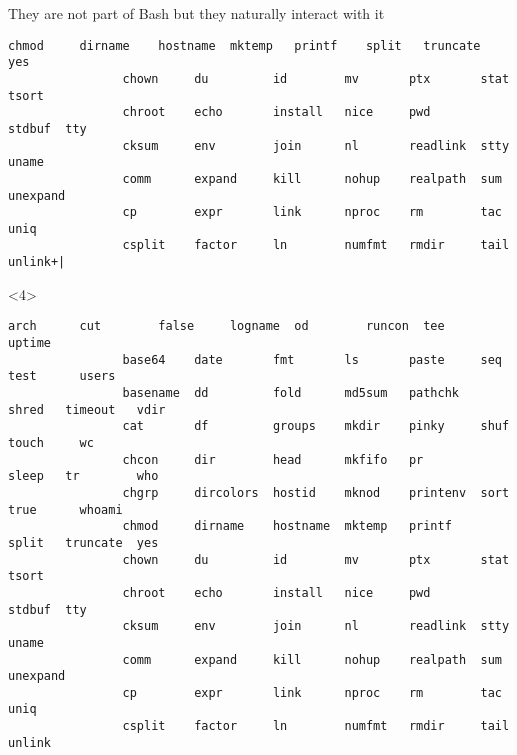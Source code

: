 \begin{frame}[fragile]{They are not part of Bash but they naturally interact with it}
\begin{overlayarea}{\textwidth}{0.6\textheight}
\begin{onlyenv}
\begin{lstlisting}[style=myBash, style=smaller, numbers=none, aboveskip=3mm]
                chmod     dirname    hostname  mktemp   printf    split   truncate  yes
                chown     du         id        mv       ptx       stat    tsort
                chroot    echo       install   nice     pwd       stdbuf  tty
                cksum     env        join      nl       readlink  stty    uname
                comm      expand     kill      nohup    realpath  sum     unexpand
                cp        expr       link      nproc    rm        tac     uniq
                csplit    factor     ln        numfmt   rmdir     tail    unlink+|
            \end{lstlisting}
        \end{onlyenv}
        \begin{onlyenv}<4>
            \begin{lstlisting}[style=myBash, style=smaller, numbers=none, aboveskip=3mm, belowskip=-8mm, deletekeywords={env, expr, nice, nohup}]
                arch      cut        false     logname  od        runcon  tee       uptime
                base64    date       fmt       ls       paste     seq     test      users
                basename  dd         fold      md5sum   pathchk   shred   timeout   vdir
                cat       df         groups    mkdir    pinky     shuf    touch     wc
                chcon     dir        head      mkfifo   pr        sleep   tr        who
                chgrp     dircolors  hostid    mknod    printenv  sort    true      whoami
                chmod     dirname    hostname  mktemp   printf    split   truncate  yes
                chown     du         id        mv       ptx       stat    tsort
                chroot    echo       install   nice     pwd       stdbuf  tty
                cksum     env        join      nl       readlink  stty    uname
                comm      expand     kill      nohup    realpath  sum     unexpand
                cp        expr       link      nproc    rm        tac     uniq
                csplit    factor     ln        numfmt   rmdir     tail    unlink
            \end{lstlisting}
        \end{onlyenv}
    \end{overlayarea}
\end{frame}
